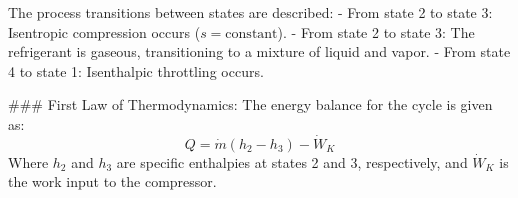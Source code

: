 The process transitions between states are described:
- From state 2 to state 3: Isentropic compression occurs (\( s = \text{constant} \)).  
- From state 2 to state 3: The refrigerant is gaseous, transitioning to a mixture of liquid and vapor.  
- From state 4 to state 1: Isenthalpic throttling occurs.

### First Law of Thermodynamics:
The energy balance for the cycle is given as:  
\[
Q = \dot{m}(h_2 - h_3) - \dot{W}_K
\]  
Where \( h_2 \) and \( h_3 \) are specific enthalpies at states 2 and 3, respectively, and \( \dot{W}_K \) is the work input to the compressor.